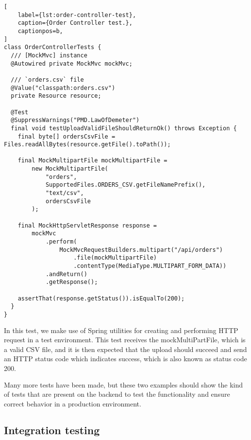 \begin{lstlisting}[
    label={lst:order-controller-test},
    caption={Order Controller test.},
    captionpos=b,
]
class OrderControllerTests {
  /// [MockMvc] instance
  @Autowired private MockMvc mockMvc;

  /// `orders.csv` file
  @Value("classpath:orders.csv")
  private Resource resource;

  @Test
  @SuppressWarnings("PMD.LawOfDemeter")
  final void testUploadValidFileShouldReturnOk() throws Exception {
    final byte[] ordersCsvFile = Files.readAllBytes(resource.getFile().toPath());

    final MockMultipartFile mockMultipartFile =
        new MockMultipartFile(
            "orders",
            SupportedFiles.ORDERS_CSV.getFileNamePrefix(),
            "text/csv",
            ordersCsvFile
        );

    final MockHttpServletResponse response =
        mockMvc
            .perform(
                MockMvcRequestBuilders.multipart("/api/orders")
                    .file(mockMultipartFile)
                    .contentType(MediaType.MULTIPART_FORM_DATA))
            .andReturn()
            .getResponse();

    assertThat(response.getStatus()).isEqualTo(200);
  }
}
\end{lstlisting}

In this test, we make use of Spring utilities for creating and performing HTTP request in a test
environment.
This test receives the mockMultiPartFile, which is a valid CSV file, and it is then expected that the
upload should succeed and send an HTTP status code which indicates success,
which is also known as status code 200.

Many more tests have been made, but these two examples should show the kind of tests that are
present on the backend to test the functionality and ensure correct behavior in a
production environment.
\subsection{Integration testing}\label{subsec:integration-tests}

